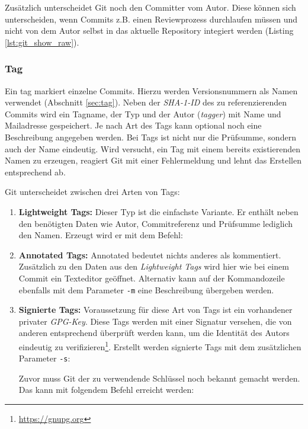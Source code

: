 
Zusätzlich unterscheidet Git noch den Committer vom Autor. Diese können sich
unterscheiden, wenn Commits z.B. einen Reviewprozess durchlaufen müssen und
nicht von dem Autor selbst in das aktuelle Repository integiert werden (Listing
\ref{lst:git_show_raw}).

\subsubsection{Tag}\label{sec:tagobject}
Ein \gls{tag} markiert einzelne Commits. Hierzu werden Versionsnummern als
Namen verwendet (Abschnitt \ref{sec:tag}). Neben der \textit{SHA-1-ID} des zu
referenzierenden Commits wird ein Tagname, der Typ und der Autor
(\textit{tagger}) mit Name und Mailadresse gespeichert. Je nach Art des Tags
kann optional noch eine Beschreibung angegeben werden. Bei Tags ist nicht nur
die Prüfsumme, sondern auch der Name eindeutig. Wird versucht, ein Tag mit einem
bereits existierenden Namen zu erzeugen, reagiert Git mit einer
Fehlermeldung und lehnt das Erstellen entsprechend ab.

Git unterscheidet zwischen drei Arten von Tags:

\begin{enumerate}
\item \textbf{Lightweight Tags:} Dieser Typ ist die einfachste Variante. Er
enthält neben den benötigten Daten wie Autor, Commitreferenz und Prüfsumme
lediglich den Namen. Erzeugt wird er mit dem Befehl:


\item \textbf{Annotated Tags:} Annotated bedeutet nichts anderes als
kommentiert. Zusätzlich zu den Daten aus den \textit{Lightweight Tags} wird
hier wie bei einem Commit ein Texteditor geöffnet. Alternativ kann auf der
Kommandozeile ebenfalls mit dem Parameter \texttt{-m} eine Beschreibung
übergeben werden.


\item \textbf{Signierte Tags:} Voraussetzung für diese Art von Tags ist ein
vorhandener privater \textit{GPG-Key}. Diese Tags werden mit einer Signatur
versehen, die von anderen entsprechend überprüft werden kann, um die Identität
des Autors eindeutig zu verifizieren\footnote{\url{https://gnupg.org}}.
Erstellt werden signierte Tags mit dem zusätzlichen Parameter \texttt{-s}:


Zuvor muss Git der zu verwendende Schlüssel noch bekannt gemacht werden. Das
kann mit folgendem Befehl erreicht werden:

\end{enumerate}

